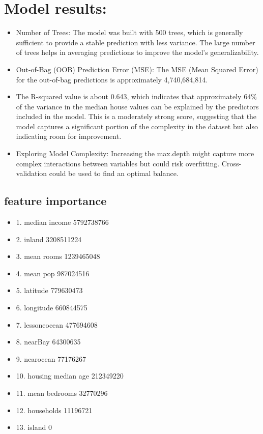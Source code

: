 \documentclass[12pt]{article}
\begin{document}
\section{Model results:}
\begin{itemize}
\item Number of Trees: The model was built with 500 trees, which is generally sufficient to provide a stable prediction with less variance. The large number of trees helps in averaging predictions to improve the model's generalizability.
\item Out-of-Bag (OOB) Prediction Error (MSE): The MSE (Mean Squared Error) for the out-of-bag predictions is approximately 4,740,684,814. 
\item The R-squared value is about 0.643, which indicates that approximately 64\% of the variance in the median house values can be explained by the predictors included in the model. This is a moderately strong score, suggesting that the model captures a significant portion of the complexity in the dataset but also indicating room for improvement.
\item Exploring Model Complexity: Increasing the max.depth might capture more complex interactions between variables but could risk overfitting. Cross-validation could be used to find an optimal balance.
\end{itemize}
\subsection{feature importance}
\begin{itemize}
\item 1. median income        5792738766
\item 2. inland               3208511224
\item 3. mean rooms           1239465048
\item 4. mean pop             987024516
\item 5. latitude             779630473
\item 6. longitude            660844575
\item 7. lessoneocean         477694608
\item 8. nearBay              64300635
\item 9. nearocean            77176267
\item 10. housing median age  212349220
\item 11. mean bedrooms       32770296       
\item 12. households          11196721
\item 13. island              0
\end{itemize}
\end{document}
